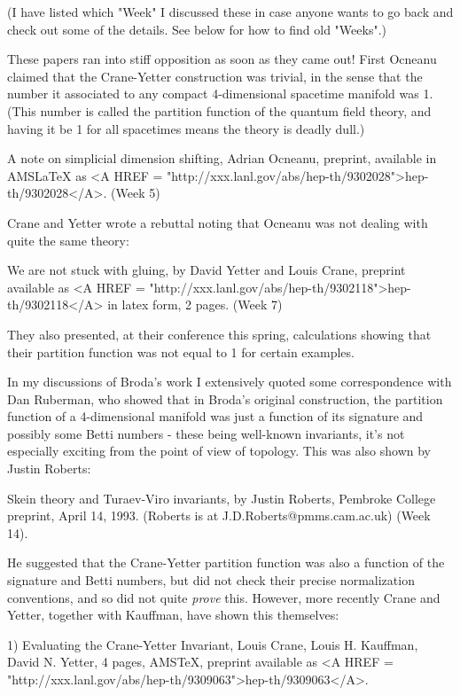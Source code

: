 (I have listed which "Week" I discussed these in case anyone wants to go
back and check out some of the details.   See below for how to find old
"Weeks".)  

These papers ran into stiff opposition as soon as they came out!  First
Ocneanu claimed that the Crane-Yetter construction was trivial, in the
sense that the number it associated to any compact 4-dimensional
spacetime manifold was 1.  (This number is called the partition function
of the quantum field theory, and having it be 1 for all spacetimes means
the theory is deadly dull.)  

A note on simplicial dimension shifting, Adrian Ocneanu, preprint,
available in AMSLaTeX as <A HREF = "http://xxx.lanl.gov/abs/hep-th/9302028">hep-th/9302028</A>.   (Week 5)

Crane and Yetter wrote a rebuttal noting that Ocneanu was not dealing
with quite the same theory:

We are not stuck with gluing, by David Yetter and Louis Crane, preprint
available as <A HREF = "http://xxx.lanl.gov/abs/hep-th/9302118">hep-th/9302118</A> in latex form, 2 pages.   (Week 7)

They also presented, at their conference this spring, calculations
showing that their partition function was not equal to 1 for certain
examples.

In my discussions of Broda's work I extensively quoted some
correspondence with Dan Ruberman, who showed that in Broda's original
construction, the partition function of a 4-dimensional manifold was
just a function of its signature and possibly some Betti numbers - these
being well-known invariants, it's not especially exciting from the point
of view of topology.   This was also shown by Justin Roberts:

Skein theory and Turaev-Viro invariants, by Justin Roberts, Pembroke
College preprint, April 14, 1993.  (Roberts is at J.D.Roberts@pmms.cam.ac.uk)
(Week 14).

He suggested that the Crane-Yetter partition function was also a
function of the signature and Betti numbers, but did not check their
precise normalization conventions, and so did not quite \emph{prove} this.
However, more recently Crane and Yetter, together with Kauffman, have
shown this themselves:

1)  Evaluating the Crane-Yetter Invariant, Louis Crane, Louis H. Kauffman,
David N. Yetter, 4 pages, AMSTeX, preprint available as <A HREF = "http://xxx.lanl.gov/abs/hep-th/9309063">hep-th/9309063</A>.


